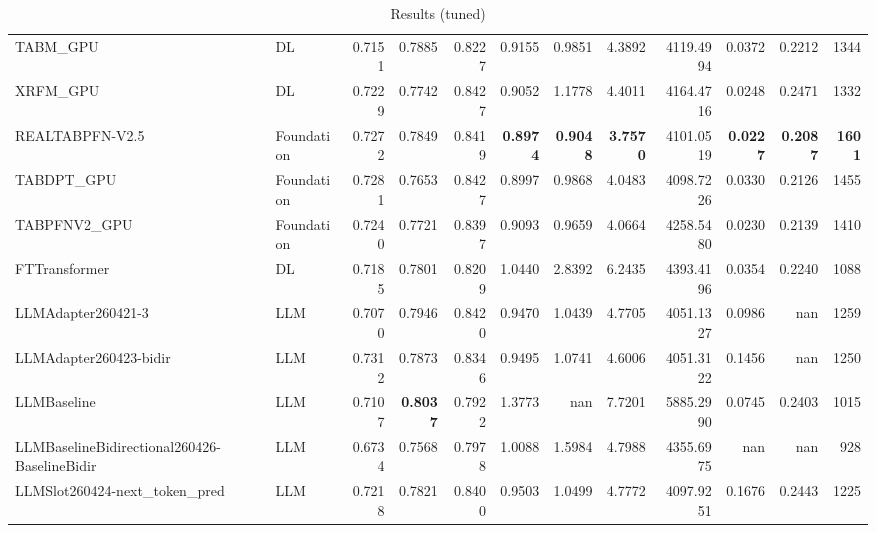 \begin{table}[htbp]
{\begin{tabular}{ll|rrrrrrrrr|r}
TABM\_GPU & DL & 0.7151 & 0.7885 & 0.8227 & 0.9155 & 0.9851 & 4.3892 & 4119.4994 & 0.0372 & 0.2212 & 1344 \\
XRFM\_GPU & DL & 0.7229 & 0.7742 & 0.8427 & 0.9052 & 1.1778 & 4.4011 & 4164.4716 & 0.0248 & 0.2471 & 1332 \\
REALTABPFN-V2.5 & Foundation & 0.7272 & 0.7849 & 0.8419 & \textbf{0.8974} & \textbf{0.9048} & \textbf{3.7570} & 4101.0519 & \textbf{0.0227} & \textbf{0.2087} & \textbf{1601} \\
TABDPT\_GPU & Foundation & 0.7281 & 0.7653 & 0.8427 & 0.8997 & 0.9868 & 4.0483 & 4098.7226 & 0.0330 & 0.2126 & 1455 \\
TABPFNV2\_GPU & Foundation & 0.7240 & 0.7721 & 0.8397 & 0.9093 & 0.9659 & 4.0664 & 4258.5480 & 0.0230 & 0.2139 & 1410 \\
\midrule
FTTransformer & DL & 0.7185 & 0.7801 & 0.8209 & 1.0440 & 2.8392 & 6.2435 & 4393.4196 & 0.0354 & 0.2240 & 1088 \\
LLMAdapter260421-3 & LLM & 0.7070 & 0.7946 & 0.8420 & 0.9470 & 1.0439 & 4.7705 & 4051.1327 & 0.0986 & nan & 1259 \\
LLMAdapter260423-bidir & LLM & 0.7312 & 0.7873 & 0.8346 & 0.9495 & 1.0741 & 4.6006 & 4051.3122 & 0.1456 & nan & 1250 \\
LLMBaseline & LLM & 0.7107 & \textbf{0.8037} & 0.7922 & 1.3773 & nan & 7.7201 & 5885.2990 & 0.0745 & 0.2403 & 1015 \\
LLMBaselineBidirectional260426-BaselineBidir & LLM & 0.6734 & 0.7568 & 0.7978 & 1.0088 & 1.5984 & 4.7988 & 4355.6975 & nan & nan & 928 \\
LLMSlot260424-next\_token\_pred & LLM & 0.7218 & 0.7821 & 0.8400 & 0.9503 & 1.0499 & 4.7772 & 4097.9251 & 0.1676 & 0.2443 & 1225 \\
\bottomrule
\end{tabular}
}
\caption{Results (tuned)}
\label{tab:results_tuned}
\end{table}